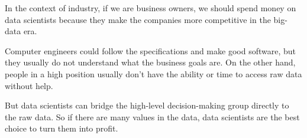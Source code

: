 In the context of industry, if we are business owners, we should spend money on data scientists because they make the companies more competitive in the big-data era.

Computer engineers could follow the specifications and make good software, but they usually do not understand what the business goals are.
On the other hand, people in a high position usually don't have the ability or time to access raw data without help.

But data scientists can bridge the high-level decision-making group directly to the raw data.
So if there are many values in the data, data scientists are the best choice to turn them into profit.




